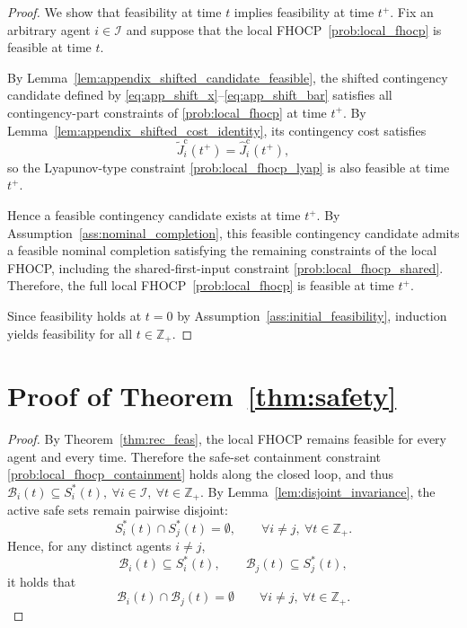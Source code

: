 \documentclass[twocolumn]{autart}
\begin{document}
\begin{proof}
We show that feasibility at time $t$ implies feasibility at time $t^+$.
Fix an arbitrary agent $i\in\mathcal I$ and suppose that the local FHOCP~\eqref{prob:local_fhocp} is feasible at time $t$.

By Lemma~\ref{lem:appendix_shifted_candidate_feasible}, the shifted contingency candidate defined by
\eqref{eq:app_shift_x}--\eqref{eq:app_shift_bar} satisfies all contingency-part constraints of \eqref{prob:local_fhocp} at time $t^+$.
By Lemma~\ref{lem:appendix_shifted_cost_identity}, its contingency cost satisfies
\[
\tilde J_i^{\mathrm c}(t^+)=\hat J_i^{\mathrm c}(t^+),
\]
so the Lyapunov-type constraint \eqref{prob:local_fhocp_lyap} is also feasible at time $t^+$.

Hence a feasible contingency candidate exists at time $t^+$.
By Assumption~\ref{ass:nominal_completion}, this feasible contingency candidate admits a feasible nominal completion satisfying the remaining constraints of the local FHOCP, including the shared-first-input constraint \eqref{prob:local_fhocp_shared}.
Therefore, the full local FHOCP~\eqref{prob:local_fhocp} is feasible at time $t^+$.

Since feasibility holds at $t=0$ by Assumption~\ref{ass:initial_feasibility}, induction yields feasibility for all $t\in\mathbb Z_+$.
\end{proof}

\section{Proof of Theorem~\ref{thm:safety}}

\begin{proof}
By Theorem~\ref{thm:rec_feas}, the local FHOCP remains feasible for every agent and every time.
Therefore the safe-set containment constraint \eqref{prob:local_fhocp_containment} holds along the closed loop, and thus
\(
\mathcal B_i(t)\subseteq S_i^\ast(t),
\ \forall i\in\mathcal I,\ \forall t\in\mathbb Z_+.
\)
By Lemma~\ref{lem:disjoint_invariance}, the active safe sets remain pairwise disjoint:
\[
S_i^\ast(t)\cap S_j^\ast(t)=\emptyset,
\qquad \forall i\neq j,\ \forall t\in\mathbb Z_+.
\]
Hence, for any distinct agents $i\neq j$,
\[
\mathcal B_i(t)\subseteq S_i^\ast(t),
\qquad
\mathcal B_j(t)\subseteq S_j^\ast(t),
\]
it holds that
\[
\mathcal B_i(t)\cap \mathcal B_j(t)=\emptyset \qquad \forall i\neq j,\ \forall t\in\mathbb Z_+.
\]
\end{proof}
\end{document}
